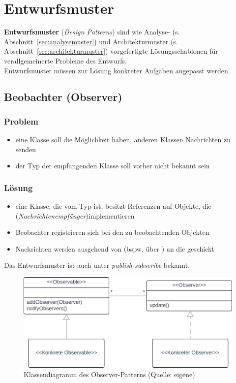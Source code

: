 \section{Entwurfsmuster}

\textbf{Entwurfsmuster} (\textit{Design Patterns}) sind wie Analyse- (s. Abschnitt~\ref{sec:analysemuster}) und Architekturmuster (s. Abschnitt~\ref{sec:architekturmuster}) vorgefertigte Lösungsschablonen für verallgemeinerte Probleme des Entwurfs.\\

\noindent
Entwurfsmuster müssen zur Lösung konkreter Aufgaben angepasst werden.

\subsection{Beobachter (Observer)}

\subsubsection*{Problem}
\begin{itemize}
    \item eine Klasse soll die Möglichkeit haben, anderen Klassen Nachrichten zu senden
    \item der Typ der empfangenden Klasse soll vorher nicht bekannt sein
\end{itemize}

\subsubsection*{Lösung}
\begin{itemize}
    \item eine Klasse, die vom Typ  ist, besitzt Referenzen auf Objekte, die  (\textit{Nachrichtenempfänger})implementieren
    \item Beobachter registrieren sich bei den zu beobachtenden Objekten
    \item Nachrichten werden ausgehend von  (bspw. über ) an die  geschickt
\end{itemize}

Das Entwurfsmuster ist auch unter \textit{publish-subscribe} bekannt.


\begin{figure}
    \centering
    \includegraphics[scale=0.4]{part two/Objektorientierter Entwurf/img/observer}
    \caption{Klassendiagramm des Observer-Patterns (Quelle: eigene)}
    \label{fig:observer}
\end{figure}

